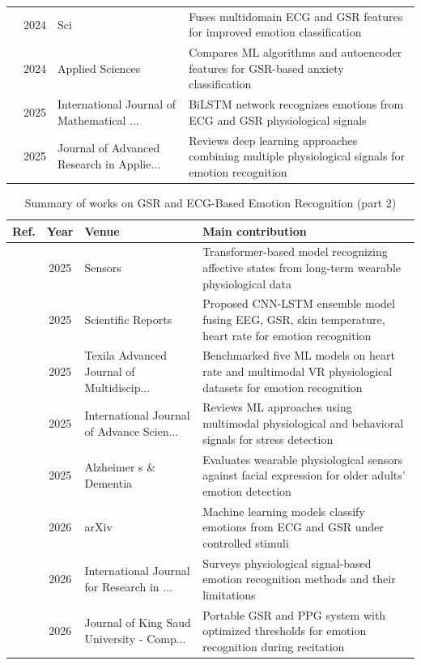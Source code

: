 \begin{table}[!t]
\begin{tabularx}{\textwidth}{@{}l c p{3.6cm} X@{}}
\cite{dessai2024multimodal} & 2024 & Sci & Fuses multidomain ECG and GSR features for improved emotion classification \\
\cite{alnafjan2024anxiety} & 2024 & Applied Sciences & Compares ML algorithms and autoencoder features for GSR-based anxiety classification \\
\cite{sumanth2025bilstm} & 2025 & International Journal of Mathematical ... & BiLSTM network recognizes emotions from ECG and GSR physiological signals \\
\cite{naveen2025emotion} & 2025 & Journal of Advanced Research in Applie... & Reviews deep learning approaches combining multiple physiological signals for emotion recognition \\
\bottomrule
\end{tabularx}
\end{table}

\begin{table}[!t]
\centering
\renewcommand{\arraystretch}{1.2}
\caption{Summary of works on GSR and ECG-Based Emotion Recognition (part 2)}
\begin{tabularx}{\textwidth}{@{}l c p{3.6cm} X@{}}
\toprule
\textbf{Ref.} & \textbf{Year} & \textbf{Venue} & \textbf{Main contribution} \\
\midrule
\cite{li2025transformer} & 2025 & Sensors & Transformer-based model recognizing affective states from long-term wearable physiological data \\
\cite{liao2025emotion} & 2025 & Scientific Reports & Proposed CNN-LSTM ensemble model fusing EEG, GSR, skin temperature, heart rate for emotion recognition \\
\cite{anon2025performance} & 2025 & Texila Advanced Journal of Multidiscip... & Benchmarked five ML models on heart rate and multimodal VR physiological datasets for emotion recognition \\
\cite{kumar2025emotions} & 2025 & International Journal of Advance Scien... & Reviews ML approaches using multimodal physiological and behavioral signals for stress detection \\
\cite{onim2025exploring} & 2025 & Alzheimer s \& Dementia & Evaluates wearable physiological sensors against facial expression for older adults' emotion detection \\
\cite{site2026emotion} & 2026 & arXiv & Machine learning models classify emotions from ECG and GSR under controlled stimuli \\
\cite{c2026survey} & 2026 & International Journal for Research in ... & Surveys physiological signal-based emotion recognition methods and their limitations \\
\cite{darabkh2026exploring} & 2026 & Journal of King Saud University - Comp... & Portable GSR and PPG system with optimized thresholds for emotion recognition during recitation \\
\bottomrule
\end{tabularx}
\end{table}

